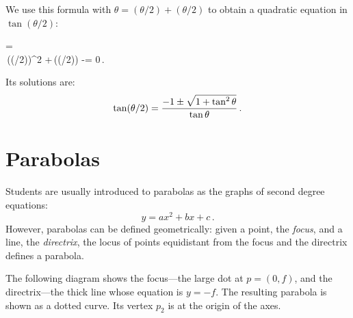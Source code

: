 We use this formula with $\theta=(\theta/2)+(\theta/2)$ to obtain a quadratic equation in $\tan(\theta/2)$:
\begin{form}{2.2}
\tan \theta=\\
\tan\theta \,(\tan(\theta/2))^2 \;+\,(\tan (\theta/2)) \;-\;\tan \theta = 0\,.
\end{form}
Its solutions are:
\[
\tan(\theta/2) = \displaystyle\frac{-1\pm\sqrt{1+\tan^2\theta}}{\tan\theta}\,.
\]

\chapter{Parabolas}\label{a.parabola}


Students are usually introduced to parabolas as the graphs of second degree equations:
\[
y=ax^2+bx+c\,.
\]
However, parabolas can be defined geometrically: given a point, the \emph{focus}, and a line, the \emph{directrix}, the locus of points equidistant from the focus and the directrix defines a parabola.


The following diagram shows the focus---the large dot at $p=(0,f)$, and the directrix---the thick line whose equation is $y=-f$. The resulting parabola is shown as a dotted curve. Its vertex $p_2$ is at the origin of the axes.

